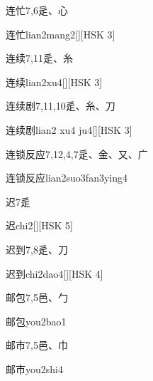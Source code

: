 \begin{entry}{连忙}{7,6}{⾡、⼼}
  \begin{phonetics}{连忙}{lian2mang2}[][HSK 3]
  \end{phonetics}
\end{entry}

\begin{entry}{连续}{7,11}{⾡、⽷}
  \begin{phonetics}{连续}{lian2xu4}[][HSK 3]
  \end{phonetics}
\end{entry}

\begin{entry}{连续剧}{7,11,10}{⾡、⽷、⼑}
  \begin{phonetics}{连续剧}{lian2 xu4 ju4}[][HSK 3]
  \end{phonetics}
\end{entry}

\begin{entry}{连锁反应}{7,12,4,7}{⾡、⾦、⼜、⼴}
  \begin{phonetics}{连锁反应}{lian2suo3fan3ying4}
  \end{phonetics}
\end{entry}

\begin{entry}{迟}{7}{⾡}
  \begin{phonetics}{迟}{chi2}[][HSK 5]
  \end{phonetics}
\end{entry}

\begin{entry}{迟到}{7,8}{⾡、⼑}
  \begin{phonetics}{迟到}{chi2dao4}[][HSK 4]
  \end{phonetics}
\end{entry}

\begin{entry}{邮包}{7,5}{⾢、⼓}
  \begin{phonetics}{邮包}{you2bao1}
  \end{phonetics}
\end{entry}

\begin{entry}{邮市}{7,5}{⾢、⼱}
  \begin{phonetics}{邮市}{you2shi4}
  \end{phonetics}
\end{entry}

